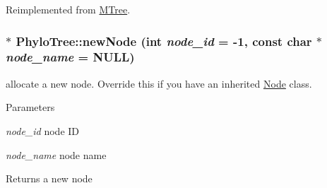 Reimplemented from \hyperlink{classMTree}{MTree}.\hypertarget{classPhyloTree_a08daeabbb3fa596916aa48834e0b152d}{
\subsubsection[{newNode}]{ $\ast$ PhyloTree::newNode (int {\em node\_\-id} = {\ttfamily -\/1}, \/  const char $\ast$ {\em node\_\-name} = {\ttfamily NULL})}}
\label{classPhyloTree_a08daeabbb3fa596916aa48834e0b152d}
allocate a new node. Override this if you have an inherited \hyperlink{classNode}{Node} class. 
\begin{DoxyParams}{Parameters}
\item[{\em node\_\-id}]node ID \item[{\em node\_\-name}]node name \end{DoxyParams}
\begin{DoxyReturn}{Returns}
a new node 
\end{DoxyReturn}


